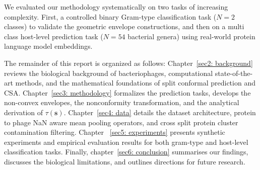 We evaluated our methodology systematically on two tasks of increasing complexity. First, 
a controlled binary Gram-type classification task ($N=2$ classes) to validate the geometric envelope constructions, and then on a 
multi class host-level prediction task ($N=54$ bacterial genera) using real-world protein language model embeddings.


The remainder of this report is organized as follows: Chapter~\ref{sec2: background} reviews the biological background 
of bacteriophages, computational state-of-the-art methods, and the mathematical foundations of split conformal prediction and CSA. 
Chapter~\ref{sec3: methodology} formalizes the prediction tasks, develops the non-convex envelopes, the nonconformity 
transformation, and the analytical derivation of $\tau(\mathbf{s})$. Chapter~\ref{sec4: data} details the dataset architecture, 
protein to phage NaN aware mean pooling operators, and cross split protein cluster contamination filtering. Chapter~
\ref{sec5: experiments} presents synthetic experiments and empirical evaluation results for both gram-type and host-level 
classification tasks. Finally, chapter~\ref{sec6: conclusion} summarises our findings, discusses the biological limitations, and 
outlines directions for future research.


